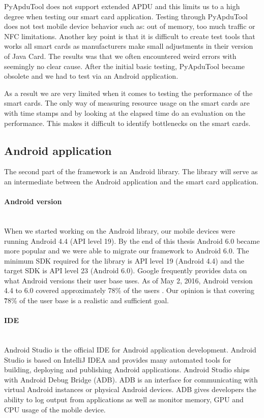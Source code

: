 PyApduTool does not support extended APDU and this limits us to a high degree when testing our smart card application. Testing through PyApduTool does not test mobile device behavior such as: out of memory, too much traffic or NFC limitations. Another key point is that it is difficult to create test tools that works all smart cards as manufacturers make small adjustments in their version of Java Card. The results was that we often encountered weird errors with seemingly no clear cause. After the initial basic testing, PyApduTool became obsolete and we had to test via an Android application.

As a result we are very limited when it comes to testing the performance of the smart cards. The only way of measuring resource usage on the smart cards are with time stamps and by looking at the elapsed time do an evaluation on the performance. This makes it difficult to identify bottlenecks on the smart cards.

\clearpage
\subsection{Android application}
The second part of the framework is an Android library. The library will serve as an intermediate between the Android application and the smart card application.

\paragraph{Android version}\mbox{}\\
When we started working on the Android library, our mobile devices were running Android 4.4 (API level 19). By the end of this thesis Android 6.0 became more popular and we were able to migrate our framework to Android 6.0. The minimum SDK required for the library is API level 19 (Android 4.4) and the target SDK is API level 23 (Android 6.0). Google frequently provides data on what Android versions their user base uses. As of May 2, 2016, Android version 4.4 to 6.0 covered approximately 78\% of the users \cite{AndroidAPIDistributions}. Our opinion is that covering \~78\% of the user base is a realistic and sufficient goal.

\paragraph{IDE}\mbox{}\\
Android Studio \cite{androidIDE} is the official IDE for Android application development. Android Studio is based on IntelliJ IDEA \cite{intelliJIDEA} and provides many automated tools for building, deploying and publishing Android applications. Android Studio ships with Android Debug Bridge (ADB). ADB is an interface for communicating with virtual Android instances or physical Android devices. ADB gives developers the ability to log output from applications as well as monitor memory, GPU and CPU usage of the mobile device.

